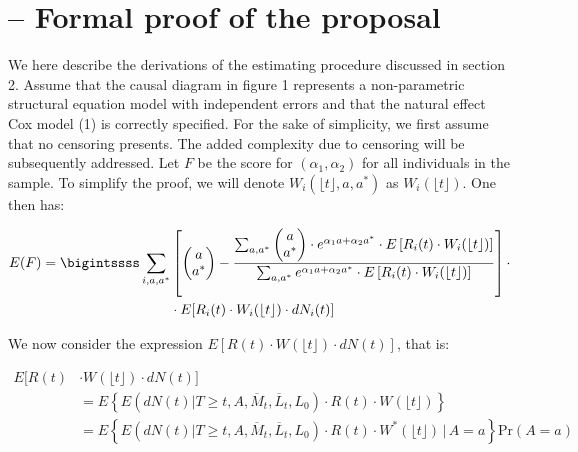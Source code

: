 \documentclass[AMA,STIX1COL]{WileyNJD-v2}
\newcommand{\pr}{\text{Pr}}
\begin{document}
\nocite{*}%

%

\appendix
\section{-- Formal proof of the proposal\label{app1}}

We here describe the derivations of the estimating procedure discussed in section 2. Assume that the causal diagram in figure 1  represents a non-parametric structural equation model with independent errors and that the natural effect Cox model (1) is correctly specified. For the sake of simplicity, we first assume that no censoring presents. The added complexity due to censoring will be subsequently addressed. Let $F$ be the score for $(\alpha_1,\alpha_2)$ for all individuals in the sample. To simplify the proof, we will denote $W_i(\lfloor t \rfloor,a,a^*)$ as $W_i(\lfloor t \rfloor)$. One then has:

\begingroup
\fontsize{10pt}{10pt}\selectfont
\begin{align*}
E(F) = \bigintssss \sum_{i, a, a^*} &\left[ \begin{pmatrix} a \\ a^* \end{pmatrix} - \frac{\sum_{a,a^*}\begin{pmatrix} a \\ a^* \end{pmatrix}\cdot e^{\alpha_1a + \alpha_2a^*}\cdot E\left[R_i(t)\cdot W_i(\lfloor t \rfloor)\right]} {\sum_{a,a^*}e^{\alpha_1a + \alpha_2a^*}\cdot E\left[R_i(t)\cdot W_i(\lfloor t \rfloor)\right]}\right]\cdot\\
&\cdot E[R_i(t)\cdot W_i(\lfloor t \rfloor)\cdot dN_i(t)]
\end{align*} 
\endgroup

We now consider the expression $E[R(t)\cdot W(\lfloor t \rfloor)\cdot dN(t)]$, that is: 

\begingroup
\fontsize{10pt}{10pt}\selectfont
\begin{align*}
E[R(t)&\cdot W(\lfloor t \rfloor)\cdot dN(t)] \\
&= E \left\{E(dN(t) | T\ge t, A, \overline{M}_{t}, \overline{L}_{t}, L_{0})\cdot R(t)\cdot W(\lfloor t \rfloor) \right\}\\
&=E \left\{E(dN(t) | T\ge t, A, \overline{M}_{t}, \overline{L}_{t}, L_{0}) \cdot R(t) \cdot W^*(\lfloor t \rfloor)\,\bigg\rvert\,A=a \right\}\pr(A=a)
\end{align*}
\endgroup
\end{document}
